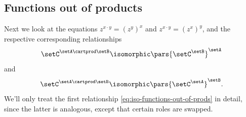 \subsection{Functions out of products}

Next we look at the equations $z^{x \cdot y} = (z^y)^x$ and $z^{x \cdot y} = (z^x)^y$, and the respective corresponding relationships
\begin{equation}\label{eq:iso-functions-out-of-prods}
    \setC^{\setA \cartprod \setB}  \isomorphic \pars{\setC^\setB}^\setA
\end{equation}
and
\begin{equation}
    \setC^{\setA \cartprod \setB}  \isomorphic \pars{\setC^\setA}^\setB.
\end{equation}
We'll only treat the first relationship \cref{eq:iso-functions-out-of-prods} in detail, since the latter is analogous, except that certain roles are swapped.

